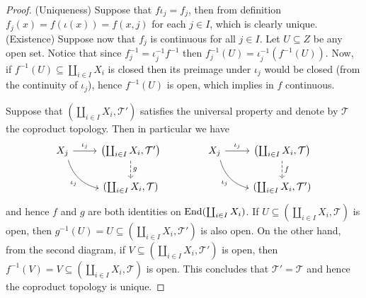 \begin{proof}
  (Uniqueness) Suppose that \(f  \iota_j = f_j\), then from definition
  \(f_j(x) = f(\iota(x)) = f(x, j)\) for each \(j \in I\), which is clearly
  unique.
  (Existence) Suppose now that \(f_j\) is continuous for all \(j \in I\). Let
  \(U \subseteq Z\) be any open set. Notice that since \(f_j^{-1} = \iota_j^{-1}
   f^{-1}\) then \(f_j^{-1}(U) = \iota_j^{-1}(f^{-1}(U))\). Now, if
  \(f^{-1}(U) \subseteq \coprod_{i \in I} X_i\) is closed then its preimage
  under \(\iota_j\) would be closed (from the continuity of \(\iota_j\)), hence
  \(f^{-1}(U)\) is open, which implies in \(f\) continuous.

  Suppose that \((\coprod_{i \in I} X_i, \mathcal T')\) satisfies the universal
  property and denote by \(\mathcal T\) the coproduct topology. Then in
  particular we have
  \[
    \begin{tikzcd}
      X_j \ar[r, "\iota_j"] \ar[rd, bend right, swap, "\iota_j"]
        &\left( \coprod_{i \in I} X_i, \mathcal T' \right)
        \ar[d, dashed, "g"] \\
        &(\coprod_{i \in I} X_i, \mathcal T)
    \end{tikzcd}
    \qquad \qquad
    \begin{tikzcd}
      X_j \ar[r, "\iota_j"] \ar[rd, bend right, swap, "\iota_j"]
        &\left( \coprod_{i \in I} X_i, \mathcal T \right)
        \ar[d, dashed, "f"] \\
        &(\coprod_{i \in I} X_i, \mathcal T')
    \end{tikzcd}
  \]
  and hence \(f\) and \(g\) are both identities on \(\operatorname{End}(\coprod_{i \in I} X_i)\). If
  \(U \subseteq (\coprod_{i \in I} X_i, \mathcal T)\) is open, then \(g^{-1}(U) = U \subseteq (\coprod_{i \in I}
  X_i, \mathcal T')\) is also open. On the other hand, from the second diagram,
  if \(V \subseteq (\coprod_{i \in I} X_i, \mathcal T')\) is open, then \(f^{-1}(V) = V \subseteq (\coprod_{i \in
  I} X_i, \mathcal T)\) is open. This concludes that \(\mathcal T' = \mathcal T\)
  and hence the coproduct topology is unique.
\end{proof}

